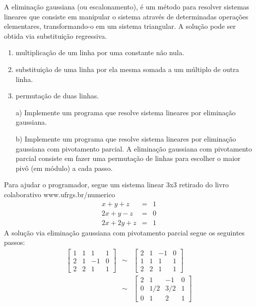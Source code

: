 \begin{exer}A eliminação gaussiana (ou escalonamento), é um método para resolver sistemas lineares que consiste em manipular o sistema através de determinadas operações elementares, transformando-o em um sistema triangular. A solução pode ser obtida via substituição regressiva.
\begin{enumerate}
\item multiplicação de um linha por uma constante não nula.
\item substituição de uma linha por ela mesma somada a um múltiplo de outra linha.
\item permutação de duas linhas.
\end{enumerate}
\begin{itemize}
 \item[a)] Implemente um programa que resolve sistema lineares por eliminação gaussiana.
 \item[b)] Implemente um programa que resolve sistema lineares por eliminação gaussiana com pivotamento parcial. A eliminação gaussiana com pivotamento parcial consiste em fazer uma permutação de linhas para escolher o maior pivô (em módulo) a cada passo.
\end{itemize}
Para ajudar o programador, segue um sistema linear 3x3 retirado do livro colaborativo www.ufrgs.br/numerico 
\begin{eqnarray*}
  x+y+z  &=& 1\\
  2x+y-z &=& 0\\
  2x+2y+z &=& 1
\end{eqnarray*}
A solução via eliminação gaussiana com pivotamento parcial segue os seguintes passos:
\begin{eqnarray*}
      \begin{bmatrix}
      1 &1&  1&1\\
      2 &1& -1&0\\
      2 & 2 &1&1
    \end{bmatrix}
    &\sim&
    \begin{bmatrix}
      2 &1& -1&0\\
      1 &1&  1&1\\
      2 &2&  1&1
    \end{bmatrix}\\
    &\sim&
    \begin{bmatrix}
      2 &1& -1&0\\
      0 &1/2& 3/2&1\\
      0 & 1 &2&1
    \end{bmatrix}\\

\end{eqnarray*}
\end{exer}
